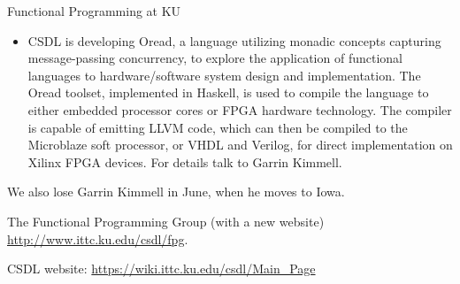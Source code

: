 \documentclass{article}
\begin{document}
\begin{hcarentry}{Functional Programming at KU}
\begin{itemize}
\item CSDL is developing Oread, a language utilizing monadic concepts capturing message-passing concurrency, to explore the application of functional languages to hardware/software system design and implementation. The Oread toolset, implemented in Haskell,  is used to compile the language to either embedded processor cores or FPGA hardware technology. The compiler is capable of emitting LLVM code, which can then be compiled to the Microblaze soft processor, or VHDL and Verilog, for direct implementation on Xilinx FPGA devices. For details talk to Garrin Kimmell.
\end{itemize}

We also lose Garrin Kimmell in June, when he moves to Iowa.

\FurtherReading
  The Functional Programming Group (with a new website)  
    \url{http://www.ittc.ku.edu/csdl/fpg}.

  CSDL website: \url{https://wiki.ittc.ku.edu/csdl/Main_Page}
\end{hcarentry}
\end{document}

